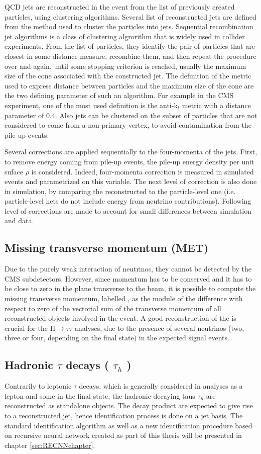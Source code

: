 QCD jets are reconstructed in the event from the list of previously created particles, using clustering algorithms. Several list of reconstructed jets are defined from the method used to cluster the particles into jets. Sequential recombination jet algorithms is a class of clustering algrorithm that is widely used in collider experiments. From the list of particles, they identify the pair of particles that are closest in some distance measure, recombine them, and then repeat the procedure over and again, until some stopping criterion is reached, usually the maximum size of the cone associated with the constructed jet. The definition of the metric used to express distance between particles and the maximum size of the cone are the two defining parameter of such an algorithm. For example in the CMS experiment, one of the most used definition is the anti-k$_t$ metric with a distance parameter of 0.4. Also jets can be clustered on the subset of particles that are not considered to come from a non-primary vertex, to avoid contamination from the pile-up events.

Several corrections are applied sequentially to the four-momenta of the jets. First, to remove energy coming from pile-up events, the pile-up energy density per unit suface $\rho$ is considered. Indeed, four-momenta correction is measured in simulated events and parametrized on this variable. The next level of correction is also done in simulation, by comparing the reconstructed \pt to the particle-level one (i.e. particle-level hets do not include energy from neutrino contributions). Following level of corrections are made to account for small differences between simulation and data.

\subsection{Missing transverse momentum (MET)}
Due to the purely weak interaction of neutrinos, they cannot be detected by the CMS subdetectors. However, since momentum has to be conserved and it has to be close to zero in the plane transverse to the beam, it is possible to compute the missing transverse momentum, labelled \ETm, as the module of the difference with respect to zero of the vectorial sum of the transverse momentum of all reconstructed objects involved in the event. A good reconstruction of the \ETm is crucial for the H$\rightarrow\tau\tau$ analyses, due to the presence of several neutrinos (two, three or four, depending on the final state) in the expected signal events.

\subsection{Hadronic $\tau$ decays ( $\tau_{h}$ )}
Contrarily to leptonic $\tau$ decays, which is generally considered in analyses as a lepton and some \ETm in the final state, the hadronic-decaying taus $\tau_{h}$ are reconstructed as standalone objects. The \tauh decay product are expected to give rise to a reconstructed jet, hence \tauh identification process is done on a jet basis. The standard \tauh identification algorithm as well as a new identification procedure based on recursive neural network created as part of this thesis will be presented in chapter \ref{sec:RECNNchapter}.
